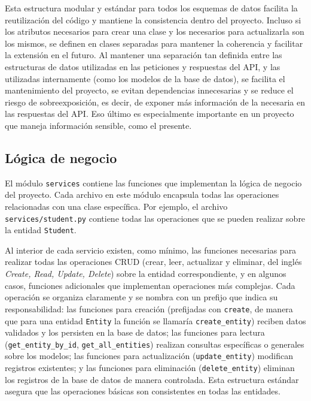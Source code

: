 Esta estructura modular y estándar para todos los esquemas de datos facilita la reutilización del código y mantiene la consistencia dentro del proyecto. Incluso si los atributos necesarios para crear una clase y los necesarios para actualizarla son los mismos, se definen en clases separadas para mantener la coherencia y facilitar la extensión en el futuro. Al mantener una separación tan definida entre las estructuras de datos utilizadas en las peticiones y respuestas del \gls{API}, y las utilizadas internamente (como los modelos de la base de datos), se facilita el mantenimiento del proyecto, se evitan dependencias innecesarias y se reduce el riesgo de \gls{sobreexposición}, es decir, de exponer más información de la necesaria en las respuestas del \gls{API}. Eso último es especialmente importante en un proyecto que maneja información sensible, como el presente.

\subsection{Lógica de negocio}

El módulo \texttt{services} contiene las funciones que implementan la lógica de negocio del proyecto. Cada archivo en este módulo encapsula todas las operaciones relacionadas con una clase específica. Por ejemplo, el archivo \texttt{services/student.py} contiene todas las operaciones que se pueden realizar sobre la entidad \texttt{Student}.

Al interior de cada servicio existen, como mínimo, las funciones necesarias para realizar todas las operaciones \gls{CRUD} (crear, leer, actualizar y eliminar, del inglés \textit{Create, Read, Update, Delete}) sobre la entidad correspondiente, y en algunos casos, funciones adicionales que implementan operaciones más complejas. Cada operación se organiza claramente y se nombra con un prefijo que indica su responsabilidad: las funciones para creación (prefijadas con \texttt{create}, de manera que para una entidad \texttt{Entity} la función se llamaría \texttt{create\_entity}) reciben datos validados y los persisten en la base de datos; las funciones para lectura (\texttt{get\_entity\_by\_id}, \texttt{get\_all\_entities}) realizan consultas específicas o generales sobre los modelos; las funciones para actualización (\texttt{update\_entity}) modifican registros existentes; y las funciones para eliminación (\texttt{delete\_entity}) eliminan los registros de la base de datos de manera controlada. Esta estructura estándar asegura que las operaciones básicas son consistentes en todas las entidades.

